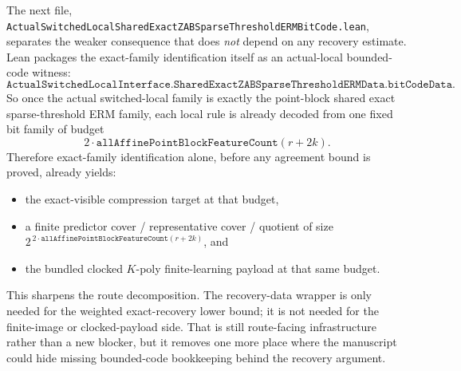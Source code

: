 \documentclass[11pt]{article}
\theoremstyle{remark}
\begin{document}
The next file,
\texttt{ActualSwitchedLocalSharedExactZABSparseThresholdERMBitCode.lean},
separates the weaker consequence that does \emph{not} depend on any recovery
estimate.  Lean packages the exact-family identification itself as an
actual-local bounded-code witness:
\[
  \texttt{ActualSwitchedLocalInterface.SharedExactZABSparseThresholdERMData.bitCodeData}.
\]
So once the actual switched-local family is exactly the point-block shared
exact sparse-threshold ERM family, each local rule is already decoded from one
fixed bit family of budget
\[
  2 \cdot \texttt{allAffinePointBlockFeatureCount}(r+2k).
\]
Therefore exact-family identification alone, before any agreement bound is
proved, already yields:
\begin{itemize}
  \item the exact-visible compression target at that budget,
  \item a finite predictor cover / representative cover / quotient of size
  \(2^{\,2 \cdot \texttt{allAffinePointBlockFeatureCount}(r+2k)}\), and
  \item the bundled clocked \(K\)-poly finite-learning payload at that same
  budget.
\end{itemize}
This sharpens the route decomposition.  The recovery-data wrapper is only
needed for the weighted exact-recovery lower bound; it is not needed for the
finite-image or clocked-payload side.  That is still route-facing
infrastructure rather than a new blocker, but it removes one more place where
the manuscript could hide missing bounded-code bookkeeping behind the recovery
argument.
\end{document}
